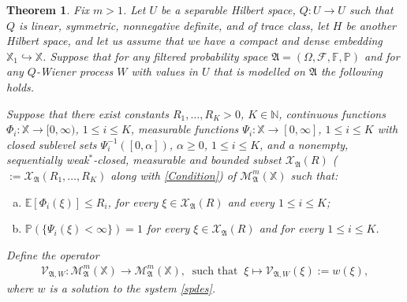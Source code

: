 \documentclass[english,a4paper,11pt]{amsart}
\theoremstyle{plain}
\newtheorem{theorem}{Theorem}[section]
\theoremstyle{definition}
\theoremstyle{remark}
\numberwithin{equation}{section}
\newcommand{\MA}{\mathfrak{A}}
\newcommand{\Fcal} {{\mathcal F}}
\newcommand{\Mcal} {{\mathcal M}}
\newcommand{\Vcal} {{\mathcal V}}
\newcommand{\Xcal} {{\mathcal X}}
\newcommand{\Afrak} {{\mathfrak A}}
\newcommand{\N}{\mathbb{N}}
\renewcommand{\P}{\mathbb{P}}
\newcommand{\X}{\mathbb{X}}
\begin{document}
	
	\begin{theorem}\label{ther_main}
		Fix $m>1$. Let $U$ be a separable Hilbert space, $Q: U\to U$ such that $Q$ is linear, symmetric, nonnegative definite, and of trace class, let $H$ be another Hilbert space, and let us assume that we have a compact and dense embedding $\mathbb{X}_1\hookrightarrow\X$. 
		Suppose that for any filtered probability space $\Afrak=(\Omega,\Fcal,\mathbb{F},\P)$
		and for any $Q$-Wiener process $W$ with values in $U$ that is modelled on $\Afrak$ the following holds.
		
		Suppose that there exist constants $R_1,\ldots,R_K>0$, $K\in\N$, continuous functions $\Phi_i:\X\to [0,\infty)$, $1\le i\le K$, measurable functions $\Psi_i:\X\to[0,\infty]$, $1\le i\le K$ with closed sublevel sets $\Psi_i^{-1}([0,\alpha])$, $\alpha\ge 0$, $1\le i\le K$, and
		a nonempty, sequentially weak$^\ast$-closed, measurable and bounded subset 
		$\Xcal_{\Afrak}(R)$ ($:=\Xcal_{\Afrak}({R_1,\ldots,R_K})$ along with \eqref{Condition}) of $\Mcal_{\MA}^m(\X)$ such that:
		\begin{enumerate}[(a)]
			\item $\mathbb{E}[\Phi_i(\xi)]\le R_i$, for every $\xi\in \Xcal_{\Afrak}(R)$ and every $1\le i\le K$;
			\item $\mathbb{P}(\{\Psi_i(\xi)<\infty\})=1$ for every $\xi\in\Xcal_{\Afrak}(R)$ and for every $1\le i\le K$.
		\end{enumerate}
	
		Define the operator 
		\begin{align*}
			\Vcal_{\Afrak,W}: \Mcal_{\MA}^m(\X) \to \Mcal_{\MA}^m(\X), \ \text{ such that } \ \xi \mapsto \Vcal_{\Afrak,W}(\xi):=w(\xi),
		\end{align*}where $w$ is a solution to the system \eqref{spdes}.
		

\end{theorem}
\end{document}
